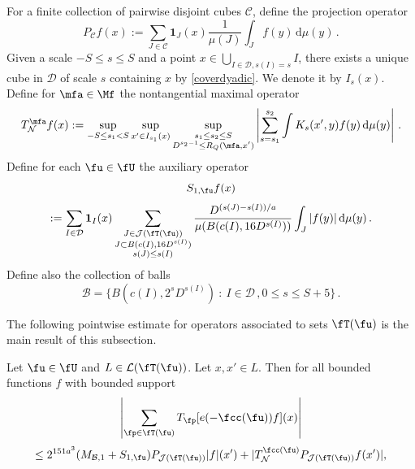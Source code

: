 For a finite collection of pairwise disjoint cubes $\mathcal{C}$, define the projection operator
$$
    P_{\mathcal{C}}f(x) :=\sum_{J\in\mathcal{C}}\mathbf{1}_J(x) \frac{1}{\mu(J)}\int_J f(y) \, \mathrm{d}\mu(y)\,.
$$
Given a scale $-S \le s\le S$ and a point $x \in \bigcup_{I\in \mathcal{D}, s(I) = s} I$, there exists a unique cube in $\mathcal{D}$ of scale $s$ containing $x$ by \eqref{coverdyadic}. We denote it by $I_s(x)$. Define for $\mfa \in \Mf$ the nontangential maximal operator
\begin{equation}
    \label{eq-TN-def}
    T_{\mathcal{N}}^\mfa f(x) := \sup_{-S \le s_1 < S} \sup_{x' \in I_{s_1}(x)} \sup_{\substack{s_1 \le s_2 \le S\\ D^{s_2-1} \le R_Q(\mfa, x')}} \left| \sum_{s = s_1}^{s_2} \int K_s(x',y) f(y) \, \mathrm{d}\mu(y) \right|\,.
\end{equation}
Define for each $\fu \in \fU$ the auxiliary operator
$$
    S_{1,\fu}f(x)
$$
\begin{equation}
    \label{eq-def-S-op}
    :=\sum_{I\in\mathcal{D}} \mathbf{1}_{I}(x) \sum_{\substack{J\in \mathcal{J}(\fT(\fu))\\
    J\subset B(c(I), 16 D^{s(I)})\\ s(J) \le s(I)}} \frac{D^{(s(J) - s(I))/a}}{\mu(B(c(I), 16D^{s(I)}))}\int_J |f(y)| \, \mathrm{d}\mu(y)\,.
\end{equation}
Define also the collection of balls
$$
    \mathcal{B} = \{B(c(I), 2^s D^{s(I)}) \ : \ I \in \mathcal{D}\,, 0 \le s \le S + 5\}\,.
$$

The following pointwise estimate for operators associated to sets $\fT(\fu)$ is the main result of this subsection.

\begin{lemma}
    \label{pointwise-tree-estimate}
    \leanok
    Let $\fu \in \fU$ and $L \in \mathcal{L}(\fT(\fu))$. Let $x, x' \in L$.
    Then for all bounded functions $f$ with bounded support
    $$
        \left|\sum_{\fp \in \fT(\fu)} T_{\fp}[ e(-\fcc(\fu))f](x)\right|
    $$
    \begin{equation}
        \label{eq-LJ-ptwise}
        \leq 2^{151a^3}(M_{\mathcal{B},1}+S_{1,\fu})P_{\mathcal{J}(\fT(\fu))}|f|(x')+|T_{\mathcal{N}}^{\fcc(\fu)} P_{\mathcal{J}(\fT(\fu))}f(x')|,
    \end{equation}
\end{lemma}


